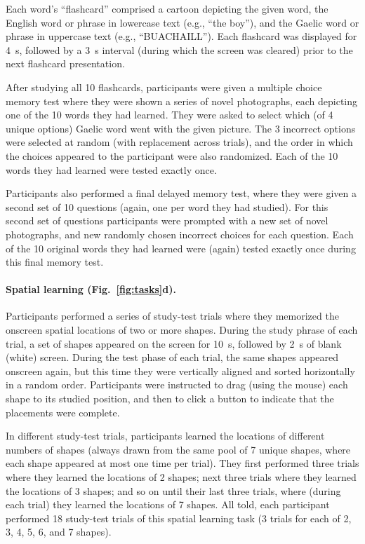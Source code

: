 \documentclass[10pt]{article}
\begin{document}
Each word's ``flashcard'' comprised a cartoon
depicting the given word, the English word or phrase in lowercase text (e.g., ``the
boy''), and the Gaelic word or phrase in uppercase text (e.g.,
``BUACHAILL'').   Each
flashcard was displayed for 4~s, followed by a 3~s interval (during
which the screen was cleared) prior to the next flashcard
presentation.

After studying all 10 flashcards, participants were given a multiple
choice memory test where they were shown a series of novel
photographs, each depicting one of the 10 words they had learned.
They were asked to select which (of 4 unique options) Gaelic word went with
the given picture.  The 3 incorrect options were selected at random
(with replacement across trials), and the order in which the choices
appeared to the participant were also randomized.  Each of the 10
words they had learned were tested exactly once.

Participants also performed a final delayed memory test, where they
were given a second set of 10 questions (again, one per word they had
studied).  For this second set of questions participants were prompted
with a new set of novel photographs, and new randomly chosen incorrect
choices for each question.  Each of the 10 original words they had
learned were (again) tested exactly once during this final memory test.



\paragraph*{Spatial learning (Fig.~\ref{fig:tasks}d).}
Participants performed a series of study-test trials where they
memorized the onscreen spatial locations of two or more shapes.
During the study phrase of each trial, a set of shapes appeared on the screen for
10~s, followed by 2~s of blank (white) screen.  During the test phase
of each trial, the same shapes appeared onscreen again, but this time
they were vertically aligned and sorted horizontally in a random
order.  Participants were instructed to drag (using the mouse) each
shape to its studied position, and then to click a button to indicate
that the placements were complete.

In different study-test trials, participants learned the locations of
different numbers of shapes (always drawn from the same pool of 7
unique shapes, where each shape appeared at most one time per trial).
They first performed three trials where they learned the locations of
2 shapes; next three trials where they learned the locations of 3
shapes; and so on until their last three trials, where (during each trial) they learned
the locations of 7 shapes.  All told, each participant performed 18
study-test trials of this spatial learning task (3 trials for each of 2, 3,
4, 5, 6, and 7 shapes).
\end{document}
